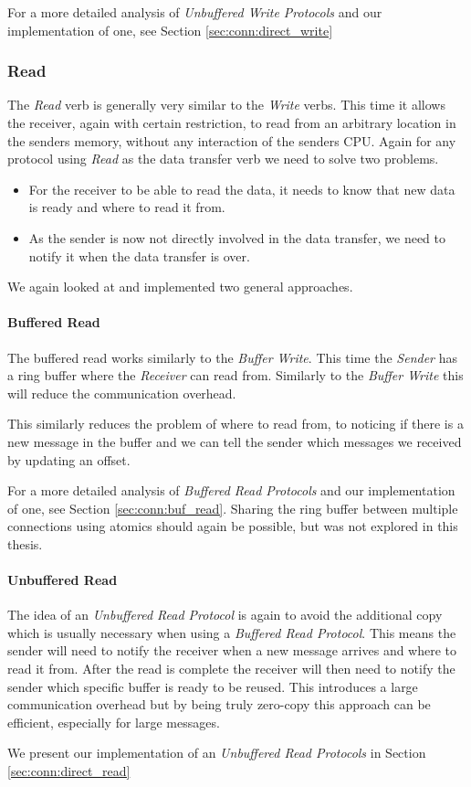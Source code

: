 For a more detailed analysis of \emph{Unbuffered Write Protocols} and our implementation of one, 
see Section \ref{sec:conn:direct_write}


\subsubsection{Read}
The \emph{Read} verb is generally very similar to the \emph{Write} verbs. This time it allows the receiver, again with certain
restriction, to read from an arbitrary location in the senders memory, without any interaction of the senders CPU. Again for
any protocol using \emph{Read} as the data transfer verb we need to solve two problems.

\begin{itemize}
  \item For the receiver to be able to read the data, it needs to know that new data is ready and where to read it from.
  \item As the sender is now not directly involved in the data transfer, we need to notify it when the data transfer is over.
\end{itemize}

We again looked at and implemented two general approaches.


\paragraph{Buffered Read}
The buffered read works similarly to the \emph{Buffer Write}. This time the \emph{Sender} has a ring buffer where the 
\emph{Receiver} can read from. Similarly to the \emph{Buffer Write} this will reduce the communication overhead. 

This similarly reduces the problem of where to read from, to noticing if there is a new message in the buffer and we can tell 
the sender which messages we received by updating an offset.

For a more detailed analysis of \emph{Buffered Read Protocols} and our implementation of one, see 
Section \ref{sec:conn:buf_read}. Sharing the ring buffer between multiple connections using atomics should again be possible,
but was not explored in this thesis.

\paragraph{Unbuffered Read}
The idea of an \emph{Unbuffered Read Protocol} is again to avoid the additional copy which is usually necessary when using a
\emph{Buffered Read Protocol}. This means the sender will need to notify the receiver when a new message arrives and where to
read it from. After the read is complete the receiver will then need to notify the sender which specific buffer is ready to 
be reused. This introduces a large communication overhead but by being truly zero-copy this approach can be efficient, 
especially for large messages.

We present our implementation of an \emph{Unbuffered Read Protocols} in Section \ref{sec:conn:direct_read}



